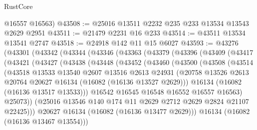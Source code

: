 \begin{lexlean}{RustCore}
\begin{coremodule}
      @16557
      @16563)
@43508 := @25016 @13511 @2232 @235 @233 @13534 @13543 @2629 @2951
@43511 := @21479 @2231 @16 @233
@43514 := @43511 @13534 @13541 @2747
@43518 := @24918 @142 @11 @15 @6027
@43593 := @43276
    (@43301
      (@43342
        (@43344
          (@43346
            (@43363
              (@43379
                (@43396
                  (@43409
                    (@43417
                      (@43421
                        (@43427
                          (@43438
                            (@43448
                              (@43452
                                (@43460
                                  (@43500
                                    (@43508
                                      (@43514
                                        (@43518
                                          @13533
                                          @13540
                                          @2607
                                          @13516
                                          @2613
                                          @24931
                                          (@20758
                                            @13526
                                            @2613
                                            @20764
                                            @20627
                                            @16134
                                            (@16082 (@16136 @13527 @2629)))
                                          @16134
                                          (@16082 (@16136 @13517 @13533)))
                                        @16542
                                        @16545
                                        @16548
                                        @16552
                                        @16557
                                        @16563)
                                      @25073))
                                  (@25016
                                    @13546
                                    @140
                                    @174
                                    @11
                                    @2629
                                    @2712
                                    @2629
                                    @2824
                                    @21107
                                    @22425)))
                              @20627
                              @16134
                              (@16082 (@16136 @13477 @2629)))
                            @16134
                            (@16082 (@16136 @13467 @13554)))

\end{coremodule}
\end{lexlean}
